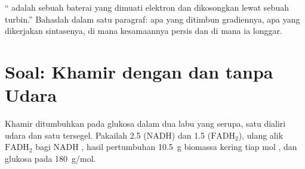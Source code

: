 \begin{exercise}[$\star\star\star$]\label{exo:b1:respiration-fermentation:12}
`` adalah sebuah baterai yang dimuati elektron dan
dikosongkan lewat sebuah turbin.'' Bahaslah dalam satu paragraf: apa
yang ditimbun gradiennya, apa yang dikerjakan sintasenya, di mana
kesamaannya persis dan di mana ia longgar.
\end{exercise}

\section{Soal: Khamir dengan dan tanpa Udara}

\begin{problem}
\label{pb:b1:respiration-fermentation:1}
Khamir ditumbuhkan pada glukosa dalam dua labu yang serupa, satu
dialiri udara dan satu tersegel. Pakailah  2.5 (NADH) dan 1.5
($\mathrm{FADH_2}$), ulang alik $\mathrm{FADH_2}$ bagi NADH ,
hasil pertumbuhan \qty{10.5}{g} biomassa kering tiap mol , dan
glukosa pada
\qty{180}{g/mol}.


\end{problem}
